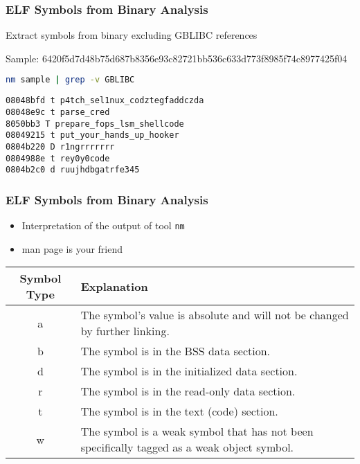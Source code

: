 \begin{frame}[fragile]
\frametitle{ELF Symbols from Binary Analysis}

Extract symbols from binary excluding GBLIBC references

Sample: 6420f5d7d48b75d687b8356e93c82721bb536c633d773f8985f74c8977425f04
\begin{lstlisting}[language=bash, basicstyle=\ttfamily, frame=single]
nm sample | grep -v GBLIBC
\end{lstlisting}


\begin{lstlisting}[basicstyle=\ttfamily, frame=single]
08048bfd t p4tch_sel1nux_codztegfaddczda
08048e9c t parse_cred
8050bb3 T prepare_fops_lsm_shellcode
08049215 t put_your_hands_up_hooker
0804b220 D r1ngrrrrrrr
0804988e t rey0y0code
0804b2c0 d ruujhdbgatrfe345
\end{lstlisting}
\end{frame}

\begin{frame}
\frametitle{ELF Symbols from Binary Analysis}

\begin{itemize}
    \item Interpretation of the output of tool \tt{nm}
    \item man page is your friend
\end{itemize}

\begin{tabular}{|c|p{}|}
\hline
\textbf{Symbol Type} & \textbf{Explanation} \\ \hline
a & The symbol's value is absolute and will not be changed by further linking. \\ \hline
b & The symbol is in the BSS data section. \\ \hline
d & The symbol is in the initialized data section. \\ \hline
r & The symbol is in the read-only data section. \\ \hline
t & The symbol is in the text (code) section. \\ \hline
w & The symbol is a weak symbol that has not been specifically tagged as a weak object symbol. \\ \hline
\end{tabular}

\end{frame}
